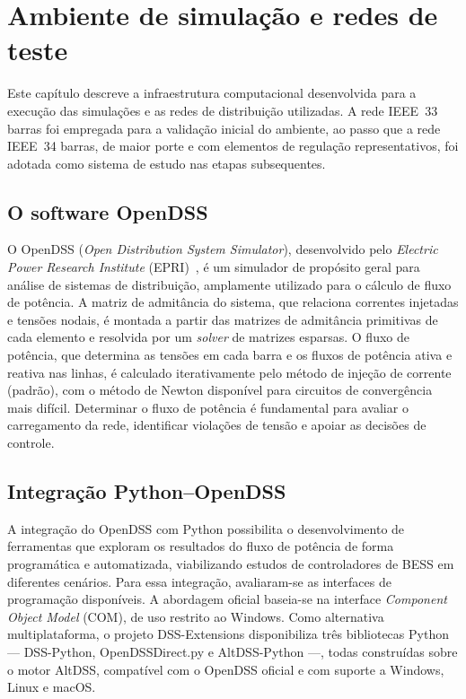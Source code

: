 \chapter{Ambiente de simulação e redes de teste}
\label{cap:ambiente}

Este capítulo descreve a infraestrutura computacional desenvolvida para a execução das simulações e as 
redes de distribuição utilizadas. A rede IEEE~33 barras foi empregada para a validação inicial do 
ambiente, ao passo que a rede IEEE~34 barras, de maior porte e com elementos de regulação 
representativos, foi adotada como sistema de estudo nas etapas subsequentes.

\section{O software OpenDSS}
\label{sec:opendss}

O OpenDSS (\emph{Open Distribution System Simulator}), desenvolvido pelo 
\emph{Electric Power Research Institute} (EPRI)~\cite{dugan2020opendss}, é um simulador de propósito 
geral para análise de sistemas de distribuição, amplamente utilizado para o cálculo de fluxo de 
potência. A matriz de admitância do sistema, que relaciona correntes injetadas e tensões nodais, é 
montada a partir das matrizes de admitância primitivas de cada elemento e resolvida por um \emph{solver} 
de matrizes esparsas. O fluxo de potência, que determina as tensões em cada barra e os fluxos de 
potência ativa e reativa nas linhas, é calculado iterativamente pelo método de injeção de corrente 
(padrão), com o método de Newton disponível para circuitos de convergência mais difícil. Determinar o 
fluxo de potência é fundamental para avaliar o carregamento da rede, identificar violações de tensão e 
apoiar as decisões de controle.

\section{Integração Python--OpenDSS}
\label{sec:api}

A integração do OpenDSS com Python possibilita o desenvolvimento de ferramentas que exploram os 
resultados do fluxo de potência de forma programática e automatizada, viabilizando estudos de 
controladores de BESS em diferentes cenários. Para essa integração, avaliaram-se as interfaces de 
programação disponíveis. A abordagem oficial baseia-se na interface \emph{Component Object Model} 
(COM), de uso restrito ao Windows. Como alternativa multiplataforma, o projeto DSS-Extensions 
disponibiliza três bibliotecas Python --- DSS-Python, OpenDSSDirect.py e AltDSS-Python ---, todas 
construídas sobre o motor AltDSS, compatível com o OpenDSS oficial e com suporte a Windows, Linux e 
macOS.


